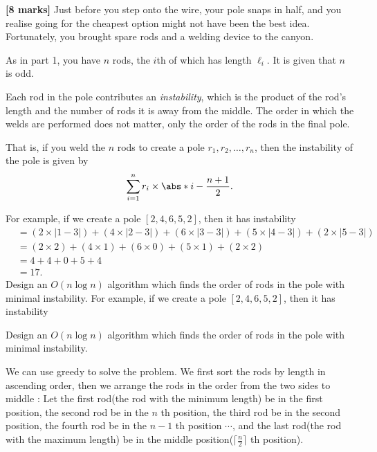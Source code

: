 \documentclass{article}
\begin{document}
\begin{Question}
\begin{Subquestion}
\begin{answer}
\end{answer}

\end{Subquestion}

\begin{Subquestion} \textbf{[8 marks]} 
Just before you step onto the wire, your pole snaps in half, and you realise going for the cheapest option might not have been the best idea. Fortunately, you brought spare rods and a welding device to the canyon.

As in part 1, you have $n$ rods, the $i$th of which has length $\ell_i$. It is given that $n$ is odd.

Each rod in the pole contributes an \emph{instability}, which is the product of the rod's length and the number of rods it is away from the middle. The order in which the welds are performed does not matter, only the order of the rods in the final pole. 

That is, if you weld the $n$ rods to create a pole $r_1, r_2, \dots, r_n$, then the instability of the pole is given by 
\begin{equation}
    \sum_{i=1}^n r_i \times \abs*{ i - \frac{n+1}{2} }.
\end{equation}

For example, if we create a pole $[2, 4, 6, 5, 2]$, then it has instability
\begin{align*}
&= (2 \times |1 - 3|) + (4 \times |2 - 3|) + (6 \times |3 - 3|) + (5 \times |4 - 3|) + (2 \times |5 - 3|) \\
&= (2 \times 2) + (4 \times 1) + (6 \times 0) + (5 \times 1) + (2 \times 2) \\
&= 4 + 4 + 0 + 5 + 4 \\
&= 17.
\end{align*}
Design an $O(n \log n)$ algorithm which finds the order of rods in the pole with minimal instability.
For example, if we create a pole $[2, 4, 6, 5, 2]$, then it has instability



Design an $O(n \log n)$ algorithm which finds the order of rods in the pole with minimal instability.
\begin{answer}
We can use greedy to solve the problem. We first sort the rods by length in ascending order, then we 
arrange the rods in the order from the two sides to middle : Let the first rod(the rod with the minimum length)
 be in the first position, the second rod be in the $n$ th position, the third rod be in the second position,
 the fourth rod be in the $n-1$ th position $\cdots$, and the last rod(the rod with the maximum length) be in the 
 middle position($\lceil \frac{n}{2}\rceil$ th position).


\end{answer}
\end{Subquestion}
\end{Question}
\end{document}
